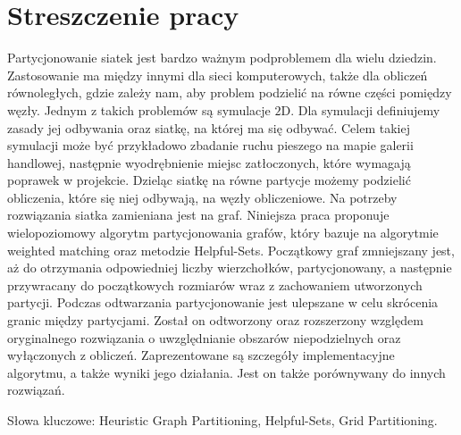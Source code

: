 \section{Streszczenie pracy}
Partycjonowanie siatek jest bardzo ważnym podproblemem dla wielu dziedzin.
Zastosowanie ma między innymi dla sieci komputerowych, także dla obliczeń równoległych, gdzie zależy nam,
aby problem podzielić na równe części pomiędzy węzły.
Jednym z takich problemów są symulacje $2$D.
Dla symulacji definiujemy zasady jej odbywania oraz siatkę, na której ma się odbywać.
Celem takiej symulacji może być przykładowo zbadanie ruchu pieszego na mapie galerii handlowej, następnie wyodrębnienie miejsc
zatłoczonych, które wymagają poprawek w projekcie.
Dzieląc siatkę na równe partycje możemy podzielić obliczenia, które się niej odbywają, na węzły obliczeniowe.
Na potrzeby rozwiązania siatka zamieniana jest na graf.
Niniejsza praca proponuje wielopoziomowy algorytm partycjonowania grafów, który bazuje na algorytmie
weighted matching oraz metodzie Helpful-Sets.
Początkowy graf zmniejszany jest, aż do otrzymania odpowiedniej liczby wierzchołków, partycjonowany, a następnie
przywracany do początkowych rozmiarów wraz z zachowaniem utworzonych partycji.
Podczas odtwarzania partycjonowanie jest ulepszane w celu skrócenia granic między partycjami.
Został on odtworzony oraz rozszerzony względem oryginalnego rozwiązania o uwzględnianie obszarów niepodzielnych
oraz wyłączonych z obliczeń.
Zaprezentowane są szczegóły implementacyjne algorytmu, a także wyniki jego działania.
Jest on także porównywany do innych rozwiązań.

\newline
\vspace{10mm}

Słowa kluczowe: Heuristic Graph Partitioning, Helpful-Sets, Grid Partitioning.